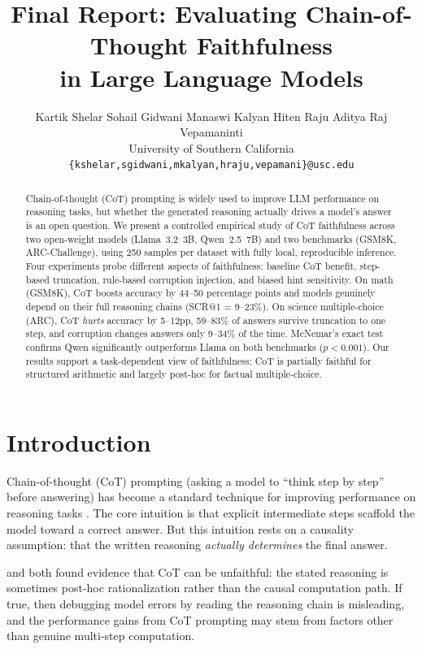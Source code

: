 \documentclass[11pt,twocolumn]{article}
\title{\textbf{Final Report: Evaluating Chain-of-Thought Faithfulness\\
  in Large Language Models}}
\author{
  Kartik Shelar \quad Sohail Gidwani \quad Manaswi Kalyan \quad
  Hiten Raju \quad Aditya Raj Vepamaninti \\[4pt]
  University of Southern California \\
  \texttt{\{kshelar,sgidwani,mkalyan,hraju,vepamani\}@usc.edu}
}
\date{}
\begin{document}
\maketitle

\begin{abstract}
Chain-of-thought (CoT) prompting is widely used to improve LLM performance on
reasoning tasks, but whether the generated reasoning actually drives a model's
answer is an open question. We present a controlled empirical study of CoT
faithfulness across two open-weight models (Llama~3.2~3B, Qwen~2.5~7B) and two
benchmarks (GSM8K, ARC-Challenge), using 250 samples per dataset with fully
local, reproducible inference. Four experiments probe different aspects of
faithfulness: baseline CoT benefit, step-based truncation, rule-based corruption
injection, and biased hint sensitivity. On math (GSM8K), CoT boosts accuracy
by 44--50 percentage points and models genuinely depend on their full reasoning
chains (SCR@1 = 9--23\%). On science multiple-choice (ARC), CoT \emph{hurts}
accuracy by 5--12pp, 59--83\% of answers survive truncation to one step, and
corruption changes answers only 9--34\% of the time. McNemar's exact test confirms
Qwen significantly outperforms Llama on both benchmarks ($p < 0.001$). Our
results support a task-dependent view of faithfulness: CoT is partially faithful
for structured arithmetic and largely post-hoc for factual multiple-choice.
\end{abstract}


\section{Introduction}

Chain-of-thought (CoT) prompting (asking a model to ``think step by step''
before answering) has become a standard technique for improving performance on
reasoning tasks \citep{wei2022chain}. The core intuition is that explicit
intermediate steps scaffold the model toward a correct answer. But this
intuition rests on a causality assumption: that the written reasoning
\emph{actually determines} the final answer.

\citet{lanham2023measuring} and \citet{turpin2023language} both found evidence
that CoT can be unfaithful: the stated reasoning is sometimes post-hoc
rationalization rather than the causal computation path. If true, then
debugging model errors by reading the reasoning chain is misleading, and the
performance gains from CoT prompting may stem from factors other than genuine
multi-step computation.
\end{document}
